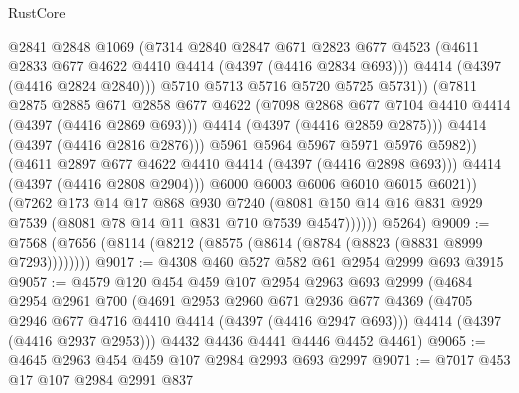 \begin{lexlean}{RustCore}
\begin{coremodule}
                            @2841
                            @2848
                            @1069
                            (@7314
                              @2840
                              @2847
                              @671
                              @2823
                              @677
                              @4523
                              (@4611 @2833 @677 @4622 @4410 @4414 (@4397 (@4416 @2834 @693)))
                              @4414
                              (@4397 (@4416 @2824 @2840)))
                            @5710
                            @5713
                            @5716
                            @5720
                            @5725
                            @5731))
                        (@7811
                          @2875
                          @2885
                          @671
                          @2858
                          @677
                          @4622
                          (@7098 @2868 @677 @7104 @4410 @4414 (@4397 (@4416 @2869 @693)))
                          @4414
                          (@4397 (@4416 @2859 @2875)))
                        @4414
                        (@4397 (@4416 @2816 @2876)))
                      @5961
                      @5964
                      @5967
                      @5971
                      @5976
                      @5982))
                  (@4611 @2897 @677 @4622 @4410 @4414 (@4397 (@4416 @2898 @693)))
                  @4414
                  (@4397 (@4416 @2808 @2904)))
                @6000
                @6003
                @6006
                @6010
                @6015
                @6021))
            (@7262
              @173
              @14
              @17
              @868
              @930
              @7240
              (@8081 @150 @14 @16 @831 @929 @7539 (@8081 @78 @14 @11 @831 @710 @7539 @4547))))))
      @5264)
@9009 := @7568 (@7656 (@8114 (@8212 (@8575 (@8614 (@8784 (@8823 (@8831 @8999 @7293))))))))
@9017 := @4308 @460 @527 @582 @61 @2954 @2999 @693 @3915
@9057 := @4579
    @120
    @454
    @459
    @107
    @2954
    @2963
    @693
    @2999
    (@4684
      @2954
      @2961
      @700
      (@4691
        @2953
        @2960
        @671
        @2936
        @677
        @4369
        (@4705 @2946 @677 @4716 @4410 @4414 (@4397 (@4416 @2947 @693)))
        @4414
        (@4397 (@4416 @2937 @2953)))
      @4432
      @4436
      @4441
      @4446
      @4452
      @4461)
@9065 := @4645 @2963 @454 @459 @107 @2984 @2993 @693 @2997
@9071 := @7017 @453 @17 @107 @2984 @2991 @837

\end{coremodule}
\end{lexlean}
